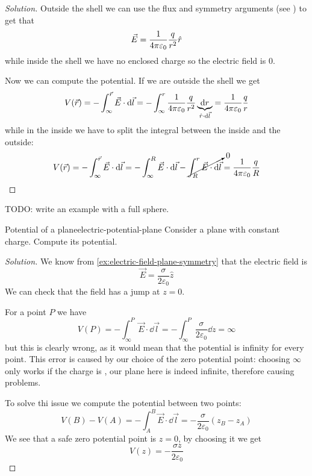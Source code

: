 \documentclass[12pt]{extarticle}
\begin{document}
\begin{proof}[Solution]
	Outside the shell we can use the flux and symmetry arguments (see ) to get that
	\begin{equation}
		\vec E = \frac{1}{4 \pi \varepsilon_0} \frac{q}{r^2} \hat r
	\end{equation}
	while inside the shell we have no enclosed charge so the electric field is $0$.

	Now we can compute the potential.
	If we are outside the shell we get
	\begin{equation}
		V(\vec r) = - \int_\infty^{\vec r} \vec E \cdot \dd{\vec l} = - \int_\infty^r \frac{1}{4 \pi \varepsilon_0} \frac{q}{r^2} \underbrace{\dd{r}}_{\hat r \cdot \dd{\vec l}} = \frac{1}{4 \pi \varepsilon_0} \frac{q}{r}
	\end{equation}
	while in the inside we have to split the integral between the inside and the outside:
	\begin{equation}
		V(\vec r) = - \int_\infty^{\vec r} \vec E \cdot \dd{\vec l} = -\int_\infty^R \vec E \cdot \dd{\vec l} - \cancelto{0}{\int_R^r \vec E \cdot \dd{\vec l}} = \frac{1}{4 \pi \varepsilon_0} \frac{q}{R}
	\end{equation}
\end{proof}

TODO: write an example with a full sphere.

\begin{example}{Potential of a plane}{electric-potential-plane}
	Consider a plane with constant charge. Compute its potential.
\end{example}

\begin{proof}[Solution]
	We know from \cref{ex:electric-field-plane-symmetry} that the electric field is
	\begin{equation}
		\vec E = \frac{\sigma}{2 \varepsilon_0} \hat z
	\end{equation}
	We can check that the field has a jump at $z = 0$.

	For a point $P$ we have
	\begin{equation}
		V(P) = - \int_\infty^P \vec E \cdot \dd{\vec l} = - \int^P_\infty \frac{\sigma}{2 \varepsilon_0} \dd{z} = \infty
	\end{equation}
	but this is clearly wrong, as it would mean that the potential is infinity for every point.
	This error is caused by our choice of the zero potential point: choosing $\infty$ only works if the charge is , our plane here is indeed infinite, therefore causing problems.

	To solve thi issue we compute the potential between two points:
	\begin{equation}
		V(B) - V(A) = -\int_A^B \vec E \cdot \dd{\vec l} = -\frac{\sigma}{2 \varepsilon_0}(z_B - z_A)
	\end{equation}
	We see that a safe zero potential point is $z = 0$, by choosing it we get
	\begin{equation}
		V(z) = -\frac{\sigma z}{2 \varepsilon_0}
	\end{equation}
\end{proof}
\end{document}
